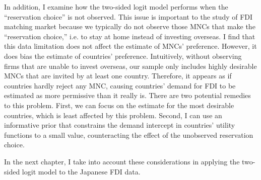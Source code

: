 In addition, I examine how the two-sided logit model performs when the
``reservation choice'' is not observed. This issue is important to the study of
FDI matching market because we typically do not observe those MNCs that make the
``reservation choice,'' i.e. to stay at home instead of investing overseas. I
find that this data limitation does not affect the estimate of MNCs' preference.
However, it does bias the estimate of countries' preference. Intuitively,
without observing firms that are unable to invest overseas, our sample only
includes highly desirable MNCs that are invited by at least one country.
Therefore, it appears as if countries hardly reject any MNC, causing countries'
demand for FDI to be estimated as more permissive than it really is. There are
two potential remedies to this problem. First, we can focus on the estimate for
the most desirable countries, which is least affected by this problem. Second, I
can use an informative prior that constrains the demand intercept in countries'
utility functions to a small value, counteracting the effect of the unobserved
reservation choice.

In the next chapter, I take into account these considerations in applying the
two-sided logit model to the Japanese FDI data.

